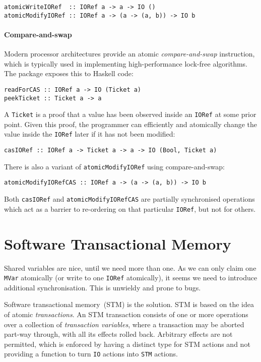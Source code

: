 \begin{verbatim}
atomicWriteIORef  :: IORef a -> a -> IO ()
atomicModifyIORef :: IORef a -> (a -> (a, b)) -> IO b
\end{verbatim}

\paragraph{Compare-and-swap}
Modern processor architectures provide an atomic \emph{compare-and-swap}
instruction, which is typically used in implementing high-performance lock-free
algorithms.  The  package exposes this to Haskell code:

\begin{verbatim}
readForCAS :: IORef a -> IO (Ticket a)
peekTicket :: Ticket a -> a
\end{verbatim}

A \verb|Ticket| is a proof that a value has been observed inside an
\verb|IORef| at some prior point.  Given this proof, the programmer
can efficiently and atomically change the value inside the
\verb|IORef| later if it has not been modified:

\begin{verbatim}
casIORef :: IORef a -> Ticket a -> a -> IO (Bool, Ticket a)
\end{verbatim}

There is also a variant of \verb|atomicModifyIORef| using compare-and-swap:

\begin{verbatim}
atomicModifyIORefCAS :: IORef a -> (a -> (a, b)) -> IO b
\end{verbatim}

Both \verb|casIORef| and \verb|atomicModifyIORefCAS| are partially
synchronised operations which act as a barrier to re-ordering on that
particular \verb|IORef|, but not for others.

\section{Software Transactional Memory}
\label{sec:concurrent_haskell-stm}

Shared variables are nice, until we need more than one.  As we can
only claim one \verb|MVar| atomically (or write to one \verb|IORef|
atomically), it seems we need to introduce additional synchronisation.
This is unwieldy and prone to bugs.

Software transactional memory~(STM) is the solution.  STM is based on
the idea of atomic \emph{transactions}.  An STM transaction consists
of one or more operations over a collection of \emph{transaction
  variables}, where a transaction may be aborted part-way through,
with all its effects rolled back.  Arbitrary effects are not
permitted, which is enforced by having a distinct type for STM actions
and not providing a function to turn \verb|IO| actions into \verb|STM|
actions.

